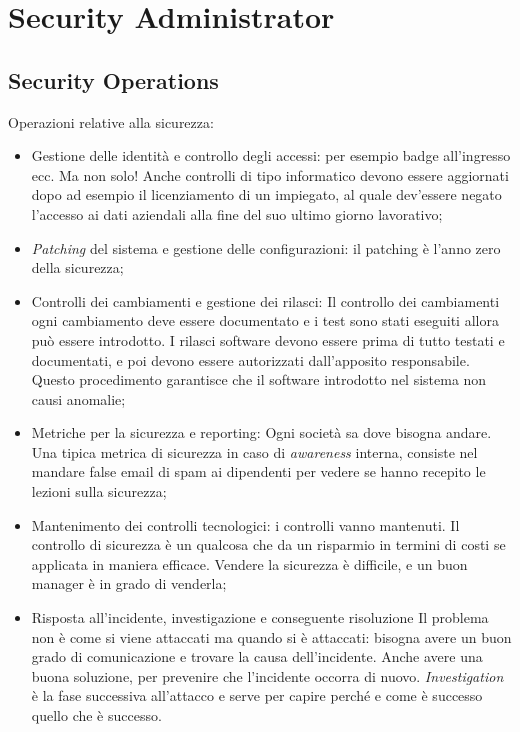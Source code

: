 
\chapter{Security Administrator}
\label{SA}

\section{Security Operations}
\label{SA:SO}

Operazioni relative alla sicurezza:
\begin{itemize}
\item Gestione delle identità e controllo degli accessi: per esempio badge 
all'ingresso ecc. Ma non solo! Anche controlli di tipo informatico devono essere 
aggiornati dopo ad esempio il licenziamento di un impiegato, al quale dev'essere 
negato l'accesso ai dati aziendali alla fine del suo ultimo giorno lavorativo;
\item \textit{Patching} del sistema e gestione delle configurazioni: il patching 
è l'anno zero della sicurezza;
\item Controlli dei cambiamenti e gestione dei rilasci: Il controllo dei 
cambiamenti ogni cambiamento deve essere documentato e i test sono stati 
eseguiti allora può essere introdotto.
I rilasci software devono essere prima di tutto testati e documentati, e poi devono essere autorizzati dall'apposito responsabile. Questo procedimento garantisce che il software introdotto nel sistema non causi anomalie;
\item Metriche per la sicurezza e reporting: Ogni società sa dove bisogna 
andare. Una tipica metrica di sicurezza in caso di \emph{awareness} interna,
consiste nel mandare false email di spam ai dipendenti per vedere se
hanno recepito le lezioni sulla sicurezza;
\item Mantenimento dei controlli tecnologici: i controlli vanno mantenuti. 
Il controllo di sicurezza è un qualcosa che da un risparmio in termini di costi 
se applicata in maniera efficace. Vendere la sicurezza è difficile, e un buon 
manager è in grado di venderla;

\item Risposta all'incidente, investigazione e conseguente risoluzione
Il problema non è come si viene attaccati ma quando si è attaccati: bisogna 
avere un buon grado di comunicazione e trovare la causa dell'incidente. Anche 
avere una buona soluzione, per prevenire che l'incidente occorra di nuovo.
\textit{Investigation} è la fase successiva all'attacco e serve per capire 
perché e come è successo quello che è successo.

\end{itemize}


